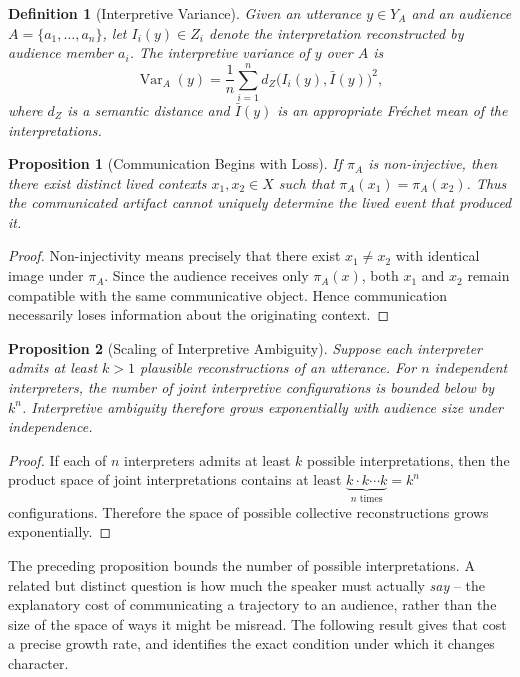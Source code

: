 \documentclass[11pt]{article}
\theoremstyle{plain}
\newtheorem{definition}{Definition}[section]
\newtheorem{proposition}{Proposition}[section]
\begin{document}
\begin{definition}[Interpretive Variance]
Given an utterance $y \in Y_A$ and an audience $A = \{a_1,\ldots,a_n\}$, let $I_i(y) \in Z_i$ denote the interpretation reconstructed by audience member $a_i$. The interpretive variance of $y$ over $A$ is
\[
\operatorname{Var}_A(y) = \frac{1}{n}\sum_{i=1}^n d_Z\big(I_i(y), \bar I(y)\big)^2,
\]
where $d_Z$ is a semantic distance and $\bar I(y)$ is an appropriate Fréchet mean of the interpretations.
\end{definition}

\begin{proposition}[Communication Begins with Loss]
If $\pi_A$ is non-injective, then there exist distinct lived contexts $x_1, x_2 \in X$ such that $\pi_A(x_1) = \pi_A(x_2)$. Thus the communicated artifact cannot uniquely determine the lived event that produced it.
\end{proposition}
\begin{proof}
Non-injectivity means precisely that there exist $x_1 \neq x_2$ with identical image under $\pi_A$. Since the audience receives only $\pi_A(x)$, both $x_1$ and $x_2$ remain compatible with the same communicative object. Hence communication necessarily loses information about the originating context.
\end{proof}

\begin{proposition}[Scaling of Interpretive Ambiguity]
Suppose each interpreter admits at least $k>1$ plausible reconstructions of an utterance. For $n$ independent interpreters, the number of joint interpretive configurations is bounded below by $k^n$. Interpretive ambiguity therefore grows exponentially with audience size under independence.
\end{proposition}
\begin{proof}
If each of $n$ interpreters admits at least $k$ possible interpretations, then the product space of joint interpretations contains at least $\underbrace{k \cdot k \cdots k}_{n \text{ times}} = k^n$ configurations. Therefore the space of possible collective reconstructions grows exponentially.
\end{proof}

The preceding proposition bounds the number of possible interpretations. A related but distinct question is how much the speaker must actually \emph{say} -- the explanatory cost of communicating a trajectory to an audience, rather than the size of the space of ways it might be misread. The following result gives that cost a precise growth rate, and identifies the exact condition under which it changes character.
\end{document}
